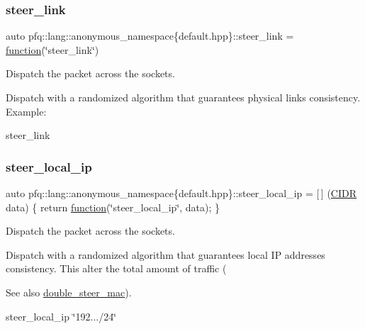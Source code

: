 \subsubsection{\texorpdfstring{steer\+\_\+link}{steer\_link}}
{\footnotesize\ttfamily auto pfq\+::lang\+::anonymous\+\_\+namespace\{default.\+hpp\}\+::steer\+\_\+link = \hyperlink{namespacepfq_1_1lang_a1a4638059d700ae08d0ca63886ff2bb3}{function}(\char`\"{}steer\+\_\+link\char`\"{})}



Dispatch the packet across the sockets. 

Dispatch with a randomized algorithm that guarantees physical links consistency. Example\+:

steer\+\_\+link \mbox{\label{namespacepfq_1_1lang_1_1anonymous__namespace_02default_8hpp_03_a4f2ef4dd2da0408a456f9b29b752686a}} 
\subsubsection{\texorpdfstring{steer\+\_\+local\+\_\+ip}{steer\_local\_ip}}
{\footnotesize\ttfamily auto pfq\+::lang\+::anonymous\+\_\+namespace\{default.\+hpp\}\+::steer\+\_\+local\+\_\+ip = \mbox{[}$\,$\mbox{]} (\hyperlink{structpfq_1_1lang_1_1CIDR}{C\+I\+DR} data) \{ return \hyperlink{namespacepfq_1_1lang_a1a4638059d700ae08d0ca63886ff2bb3}{function}(\char`\"{}steer\+\_\+local\+\_\+ip\char`\"{}, data); \}}



Dispatch the packet across the sockets. 

Dispatch with a randomized algorithm that guarantees local IP addresses consistency. This alter the total amount of traffic (\begin{DoxySeeAlso}{See also}
\hyperlink{namespacepfq_1_1lang_1_1anonymous__namespace_02default_8hpp_03_a122b03580c609d71ca622ef9b15fa78d}{double\+\_\+steer\+\_\+mac}).
\end{DoxySeeAlso}
steer\+\_\+local\+\_\+ip \char`\"{}192.../24\char`\"{} \mbox{\label{namespacepfq_1_1lang_1_1anonymous__namespace_02default_8hpp_03_a6344b2b22c9e20a2015452ad2c1002f7}} 
